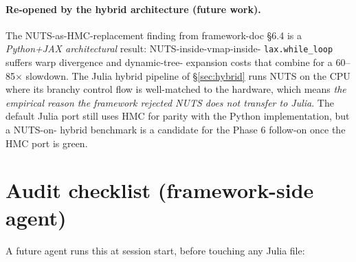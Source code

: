 \documentclass[11pt,a4paper]{article}
\begin{document}
\paragraph{Re-opened by the hybrid architecture (future work).}
The NUTS-as-HMC-replacement finding from framework-doc §6.4 is a
\emph{Python+JAX architectural} result: NUTS-inside-vmap-inside-
\texttt{lax.while\_loop} suffers warp divergence and dynamic-tree-
expansion costs that combine for a 60--85$\times$ slowdown. The
Julia hybrid pipeline of §\ref{sec:hybrid} runs NUTS on the CPU
where its branchy control flow is well-matched to the hardware,
which means \emph{the empirical reason the framework rejected NUTS
does not transfer to Julia}. The default Julia port still uses
HMC for parity with the Python implementation, but a NUTS-on-
hybrid benchmark is a candidate for the Phase 6 follow-on once the
HMC port is green.

\section{Audit checklist (framework-side agent)}
\label{sec:checklist-julia}

A future agent runs this at session start, before touching any
Julia file:
\end{document}
